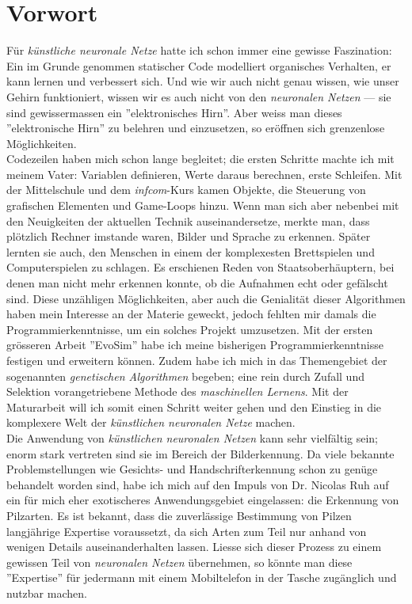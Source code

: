 \section*{Vorwort}
 Für \textit{künstliche neuronale Netze} hatte ich schon immer eine gewisse Faszination: Ein im Grunde genommen statischer Code modelliert organisches Verhalten, er kann lernen und verbessert sich. Und wie wir auch nicht genau wissen, wie unser Gehirn funktioniert, wissen wir es auch nicht von den \textit{neuronalen Netzen} --- sie sind gewissermassen ein ''elektronisches Hirn''. Aber weiss man dieses ''elektronische Hirn'' zu belehren und einzusetzen, so eröffnen sich grenzenlose Möglichkeiten.\\
 
 Codezeilen haben mich schon lange begleitet; die ersten Schritte machte ich mit meinem Vater: Variablen definieren, Werte daraus berechnen, erste Schleifen. Mit der Mittelschule und dem \textit{infcom}-Kurs kamen Objekte, die Steuerung von grafischen Elementen und Game-Loops hinzu. Wenn man sich aber nebenbei mit den Neuigkeiten der aktuellen Technik auseinandersetze, merkte man, dass plötzlich Rechner imstande waren, Bilder und Sprache zu erkennen. Später lernten sie auch, den Menschen in einem der komplexesten Brettspielen und Computerspielen zu schlagen. Es erschienen Reden von Staatsoberhäuptern, bei denen man nicht mehr erkennen konnte, ob die Aufnahmen echt oder gefälscht sind. Diese unzähligen Möglichkeiten, aber auch die Genialität dieser Algorithmen haben mein Interesse an der Materie geweckt, jedoch fehlten mir damals die Programmierkenntnisse, um ein solches Projekt umzusetzen. Mit der ersten grösseren Arbeit ''EvoSim''\cite{evosim} habe ich meine bisherigen Programmierkenntnisse festigen und erweitern können. Zudem habe ich mich in das Themengebiet der sogenannten \textit{genetischen Algorithmen} begeben; eine rein durch Zufall und Selektion vorangetriebene Methode des \textit{maschinellen Lernens}. Mit der Maturarbeit will ich somit einen Schritt weiter gehen und den Einstieg in die komplexere Welt der \textit{künstlichen neuronalen Netze} machen.\\
 
 Die Anwendung von \textit{künstlichen neuronalen Netzen} kann sehr vielfältig sein; enorm stark vertreten sind sie im Bereich der Bilderkennung. Da viele bekannte Problemstellungen wie Gesichts- und Handschrifterkennung schon zu genüge behandelt worden sind, habe ich mich auf den Impuls von Dr. Nicolas Ruh auf ein für mich eher exotischeres Anwendungsgebiet eingelassen: die Erkennung von Pilzarten. Es ist bekannt, dass die zuverlässige Bestimmung von Pilzen langjährige Expertise voraussetzt, da sich Arten zum Teil nur anhand von wenigen Details auseinanderhalten lassen. Liesse sich dieser Prozess zu einem gewissen Teil von \textit{neuronalen Netzen} übernehmen, so könnte man diese ''Expertise'' für jedermann mit einem Mobiltelefon in der Tasche zugänglich und nutzbar machen.\\ 
 
